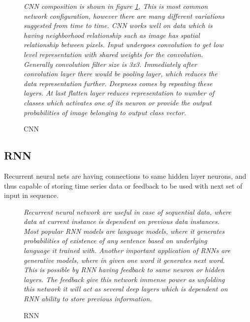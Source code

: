 \begin{figure}[H]
	\centering
	\caption{\label{fig:cnn} CNN}
	\medskip
	\small
	\begin{flushleft}
		\textit{CNN composition is shown in figure \ref{fig:cnn}, This is most common network configuration, however there are many different variations suggested from time to time. CNN works well on data which is having neighborhood relationship such as image has spatial relationship between pixels. Input undergoes convolution to get low level representation with shared weights for the convolution. Generally convolution filter size is 3x3. Immediately after convolution layer there would be pooling layer, which reduces the data representation further. Deepness comes by repeating these layers. At last flatten layer reduces representation to number of classes which activates one of its neuron or provide the output probabilities of image belonging to output class vector.}
	\end{flushleft}
	
\end{figure}


\subsection{RNN}
Recurrent neural nets are having connections to same hidden layer neurons, and thus capable of storing time series data or feedback to be used with next set of input in sequence.

\begin{figure}[H]
\centering
{}
\caption{\label{fig:rnn} RNN}
\medskip
\small
\begin{flushleft}
	\textit{Recurrent neural network are useful in case of sequential data, where data at current instance is dependent on previous data instances. Most popular RNN models are language models, where it generates probabilities of existence of any sentence based on underlying language it trained with. Another important application of RNNs are generative models, where in given one word it generates next word. This is possible by RNN having feedback to same neuron or hidden layers. The feedback give this network immense power as unfolding this network it will act as several deep layers which is dependent on RNN ability to store previous information.}
\end{flushleft}

\end{figure}


